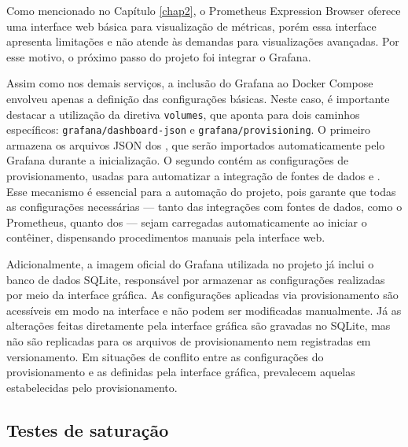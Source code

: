 Como mencionado no Capítulo \ref{chap2}, o Prometheus Expression Browser oferece uma interface web básica para visualização de métricas, porém essa interface apresenta limitações e não atende às demandas para visualizações avançadas. Por esse motivo, o próximo passo do projeto foi integrar o Grafana.

Assim como nos demais serviços, a inclusão do Grafana ao Docker Compose envolveu apenas a definição das configurações básicas. Neste caso, é importante destacar a utilização da diretiva \verb|volumes|, que aponta para dois caminhos específicos: \verb|grafana/dashboard-json| e \verb|grafana/provisioning|. O primeiro armazena os arquivos JSON dos , que serão importados automaticamente pelo Grafana durante a inicialização. O segundo contém as configurações de provisionamento, usadas para automatizar a integração de fontes de dados e . Esse mecanismo é essencial para a automação do projeto, pois garante que todas as configurações necessárias --- tanto das integrações com fontes de dados, como o Prometheus, quanto dos  --- sejam carregadas automaticamente ao iniciar o contêiner, dispensando procedimentos manuais pela interface web.

Adicionalmente, a imagem oficial do Grafana utilizada no projeto já inclui o banco de dados SQLite, responsável por armazenar as configurações realizadas por meio da interface gráfica. As configurações aplicadas via provisionamento são acessíveis em modo  na interface e não podem ser modificadas manualmente. Já as alterações feitas diretamente pela interface gráfica são gravadas no SQLite, mas não são replicadas para os arquivos de provisionamento nem registradas em versionamento. Em situações de conflito entre as configurações do provisionamento e as definidas pela interface gráfica, prevalecem aquelas estabelecidas pelo provisionamento.

\subsection{Testes de saturação}
\label{subsection:TestesSaturacao}

